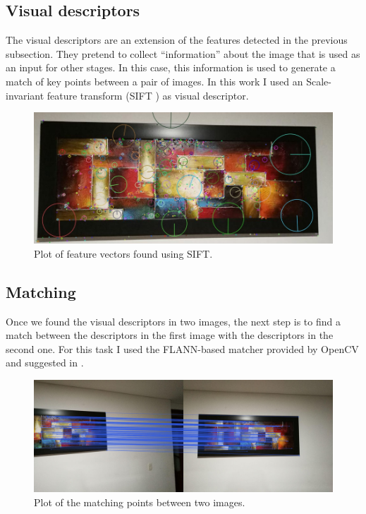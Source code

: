 \documentclass[journal]{IEEEtran}
\begin{document}
\subsection{Visual descriptors}

The visual descriptors are an extension of the features detected in the
previous subsection. They pretend to collect ``information'' about the
image that is used as an input for other stages. In this case, this
information is used to generate a match of key points between a pair of
images. In this work I used an Scale-invariant feature transform \cite{wiki:sift}
(SIFT ) as visual descriptor.

\begin{figure}[H]
\includegraphics[scale=0.2]{../img/descriptor_example}
\caption{Plot of feature vectors found using SIFT.}
\label{canny}
\end{figure}

\subsection{Matching}

Once we found the visual descriptors in two images, the next step is to
find a match between the descriptors in the first image with the descriptors
in the second one. For this task I used the FLANN-based matcher provided
by OpenCV and suggested in \cite{opencv:tutorial}.

\begin{figure}[H]
\includegraphics[scale=0.1]{../img/matches1}
\caption{Plot of the matching points between two images.}
\label{canny}
\end{figure}
\end{document}
